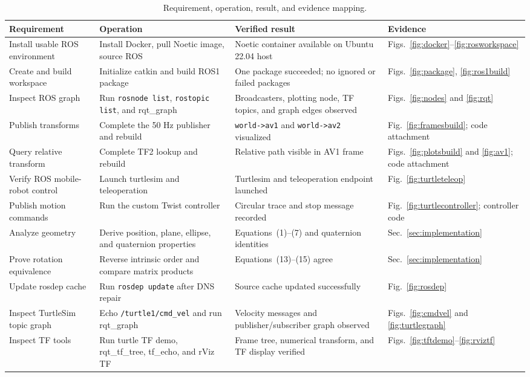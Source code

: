 \documentclass[letterpaper, 10 pt, conference]{ieeeconf}
\begin{document}
\begin{table}[t]
\caption{Requirement, operation, result, and evidence mapping.}
\label{tab:evidence}
\centering
\footnotesize
\setlength{\tabcolsep}{2pt}
\begin{tabular}{p{}p{}p{}p{}}
\toprule
Requirement & Operation & Verified result & Evidence \\
\midrule
Install usable ROS environment & Install Docker, pull Noetic image, source ROS & Noetic container available on Ubuntu 22.04 host & Figs.~\ref{fig:docker}--\ref{fig:rosworkspace} \\
Create and build workspace & Initialize catkin and build ROS1 package & One package succeeded; no ignored or failed packages & Figs.~\ref{fig:package}, \ref{fig:ros1build} \\
Inspect ROS graph & Run \texttt{rosnode list}, \texttt{rostopic list}, and rqt\_graph & Broadcasters, plotting node, TF topics, and graph edges observed & Figs.~\ref{fig:nodes} and \ref{fig:rqt} \\
Publish transforms & Complete the 50 Hz publisher and rebuild & \texttt{world->av1} and \texttt{world->av2} visualized & Fig.~\ref{fig:framesbuild}; code attachment \\
Query relative transform & Complete TF2 lookup and rebuild & Relative path visible in AV1 frame & Figs.~\ref{fig:plotsbuild} and \ref{fig:av1}; code attachment \\
Verify ROS mobile-robot control & Launch turtlesim and teleoperation & Turtlesim and teleoperation endpoint launched & Fig.~\ref{fig:turtleteleop} \\
Publish motion commands & Run the custom Twist controller & Circular trace and stop message recorded & Fig.~\ref{fig:turtlecontroller}; controller code \\
Analyze geometry & Derive position, plane, ellipse, and quaternion properties & Equations~(1)--(7) and quaternion identities & Sec.~\ref{sec:implementation} \\
Prove rotation equivalence & Reverse intrinsic order and compare matrix products & Equations~(13)--(15) agree & Sec.~\ref{sec:implementation} \\
Update rosdep cache & Run \texttt{rosdep update} after DNS repair & Source cache updated successfully & Fig.~\ref{fig:rosdep} \\
Inspect TurtleSim topic graph & Echo \texttt{/turtle1/cmd\_vel} and run rqt\_graph & Velocity messages and publisher/subscriber graph observed & Figs.~\ref{fig:cmdvel} and \ref{fig:turtlegraph} \\
Inspect TF tools & Run turtle TF demo, rqt\_tf\_tree, tf\_echo, and rViz TF & Frame tree, numerical transform, and TF display verified & Figs.~\ref{fig:tftdemo}--\ref{fig:rviztf} \\
\bottomrule
\end{tabular}
\end{table}
\end{document}
